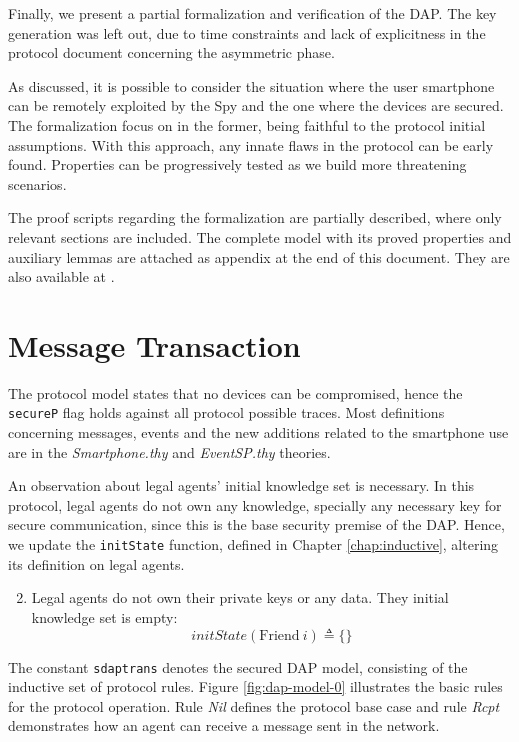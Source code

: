 \label{chap:verification}
Finally, we present a partial formalization and verification of the DAP\@. The key generation was left out, due to time constraints and lack of explicitness in the protocol document concerning the asymmetric phase.

As discussed, it is possible to consider the situation where the user smartphone can be remotely exploited by the Spy and the one where the devices are secured. The formalization focus on in the former, being faithful to the protocol initial assumptions. With this approach, any innate flaws in the protocol can be early found. Properties can be progressively tested as we build more threatening scenarios.

The proof scripts regarding the formalization are partially described, where only relevant sections are included. The complete model with its proved properties and auxiliary lemmas are attached as appendix at the end of this document. They are also available at \cite{RodopoulosGithub}.

\section{Message Transaction}
The protocol model states that no devices can be compromised, hence the \texttt{secureP} flag holds against all protocol possible traces. Most definitions concerning messages, events and the new additions related to the smartphone use are in the \textit{Smartphone.thy} and \textit{EventSP.thy} theories.

An observation about legal agents' initial knowledge set is necessary. In this protocol, legal agents do not own any knowledge, specially any necessary key for secure communication, since this is the base security premise of the DAP. Hence, we update the \texttt{initState} function, defined in Chapter \ref{chap:inductive}, altering its definition on legal agents.

\begin{enumerate}
  \setcounter{enumi}{1}

  \item Legal agents do not own their private keys or any data. They initial knowledge set is empty:
  \begin{equation*}
    initState (\text{Friend} \ i) \triangleq \{\}
  \end{equation*}
\end{enumerate}

The constant \texttt{sdaptrans} denotes the secured DAP model, consisting of the inductive set of protocol rules. Figure \ref{fig:dap-model-0} illustrates the basic rules for the protocol operation. Rule \textit{Nil} defines the protocol base case and rule \textit{Rcpt} demonstrates how an agent can receive a message sent in the network.

